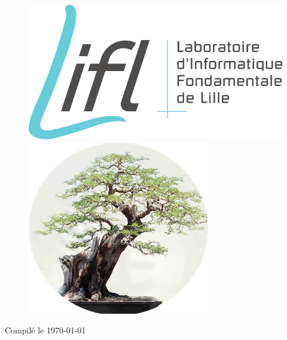 \begin{titlepage}
\begin{center}
\begin{figure}[H]
    \begin{minipage}[t]{8cm}
        \centering
	\includegraphics[scale=0.15]{img/logo-lifl.png}
    \end{minipage}
    \begin{minipage}[t]{8cm}
        \centering
        \includegraphics[scale=1]{img/bonsai-rond.jpg}
    \end{minipage}
\end{figure}

\vfill

{\large Compilé le \today}

\end{center}
\end{titlepage}
